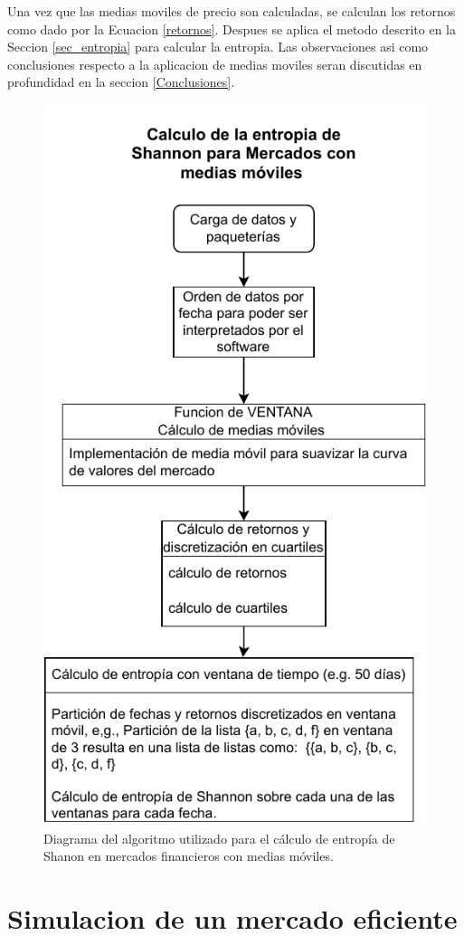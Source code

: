 Una vez que las medias moviles de precio son calculadas, se calculan los retornos como dado por la Ecuacion \ref{retornos}.
Despues se aplica el metodo descrito en la Seccion \ref{sec_entropia} para calcular la entropia.
Las observaciones asi como conclusiones respecto a la aplicacion de medias moviles seran discutidas en profundidad en la seccion \ref{Conclusiones}.


\begin{figure}
	\centering
	\includegraphics[width=0.7\linewidth]{figures/entropiaMAV}
	\caption{Diagrama del algoritmo utilizado para el c\'alculo de entrop\'ia de Shanon en mercados financieros con medias m\'oviles.}
	\label{entropiamav}
\end{figure}



\section{Simulacion de un mercado eficiente}

